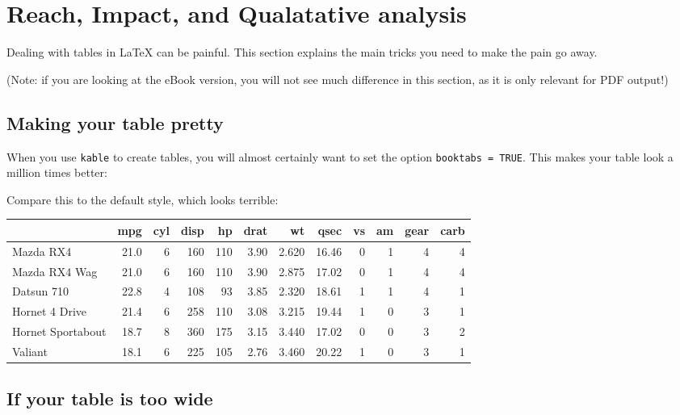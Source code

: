 \documentclass[a4paper, nobind]{templates/ociamthesis}
\begin{document}
\hypertarget{reach-impact-and-qualatative-analysis}{%
\section{Reach, Impact, and Qualatative analysis}\label{reach-impact-and-qualatative-analysis}}

Dealing with tables in LaTeX can be painful.
This section explains the main tricks you need to make the pain go away.

(Note: if you are looking at the eBook version, you will not see much difference in this section, as it is only relevant for PDF output!)

\hypertarget{making-your-table-pretty}{%
\subsection{Making your table pretty}\label{making-your-table-pretty}}

When you use \texttt{kable} to create tables, you will almost certainly want to set the option \texttt{booktabs\ =\ TRUE}.
This makes your table look a million times better:

Compare this to the default style, which looks terrible:

\begin{tabular}{l|r|r|r|r|r|r|r|r|r|r|r}
\hline
  & mpg & cyl & disp & hp & drat & wt & qsec & vs & am & gear & carb\\
\hline
Mazda RX4 & 21.0 & 6 & 160 & 110 & 3.90 & 2.620 & 16.46 & 0 & 1 & 4 & 4\\
\hline
Mazda RX4 Wag & 21.0 & 6 & 160 & 110 & 3.90 & 2.875 & 17.02 & 0 & 1 & 4 & 4\\
\hline
Datsun 710 & 22.8 & 4 & 108 & 93 & 3.85 & 2.320 & 18.61 & 1 & 1 & 4 & 1\\
\hline
Hornet 4 Drive & 21.4 & 6 & 258 & 110 & 3.08 & 3.215 & 19.44 & 1 & 0 & 3 & 1\\
\hline
Hornet Sportabout & 18.7 & 8 & 360 & 175 & 3.15 & 3.440 & 17.02 & 0 & 0 & 3 & 2\\
\hline
Valiant & 18.1 & 6 & 225 & 105 & 2.76 & 3.460 & 20.22 & 1 & 0 & 3 & 1\\
\hline
\end{tabular}

\hypertarget{if-your-table-is-too-wide}{%
\subsection{If your table is too wide}\label{if-your-table-is-too-wide}}
\end{document}

